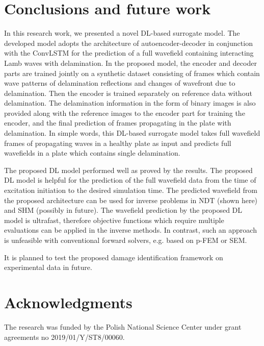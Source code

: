 \documentclass[pdflatex,sn-mathphys-num]{sn-jnl}%
\begin{document}
	\section{Conclusions and future work}
	\label{conclusion}
	In this research work, we presented a novel DL-based surrogate model. 
	The developed model adopts the architecture of autoencoder-decoder in 
	conjunction with the ConvLSTM for the prediction of a full wavefield 
	containing interacting Lamb waves with delamination. 
	In the proposed model, the encoder and decoder parts are trained jointly on 
	a synthetic dataset consisting of frames which contain wave patterns of 
	delamination reflections and changes of wavefront due to delamination. 
	Then the encoder is trained separately on reference data without 
	delamination. 
	The delamination information in the form of binary images is also provided 
	along with the reference images to the encoder part for training the 
	encoder, and the final prediction of frames propagating in the plate with 
	delamination.
	In simple words, this DL-based surrogate model takes full wavefield frames 
	of propagating waves in a healthy plate as input and predicts full 
	wavefields in a plate which contains single delamination.
	
	The proposed DL model performed well as proved by the results.
	The proposed DL model is helpful for the prediction of the full wavefield 
	data from the time of excitation initiation to the desired simulation time. 
	The predicted wavefield from the proposed architecture can be used for 
	inverse problems in NDT (shown here) and SHM (possibly in future).
	The wavefield prediction by the proposed DL model is ultrafast, therefore 
	objective functions which require multiple evaluations can be applied in 
	the inverse methods.
	In contrast, such an approach is unfeasible with conventional forward 
	solvers, e.g. based on p-FEM or SEM. 
	
	It is planned to test the proposed damage identification framework on 
	experimental data in future.
	
	\clearpage	
	\section*{Acknowledgments}
	The research was funded by the Polish National Science Center under grant agreements no 2019/01/Y/ST8/00060.
	
\end{document}
